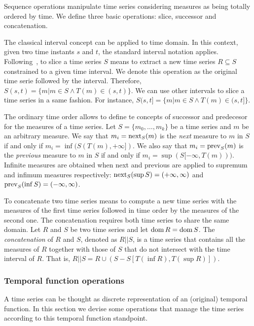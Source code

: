 Sequence operations manipulate time series considering measures as
being totally ordered by time.  We define three basic operations:
slice, successor and concatenation.


The classical interval concept can be applied to time domain. In this
context, given two time instants $s$ and $t$, the standard interval
notation applies.
%
Following~\cite{last:hetland}, to slice a time series $S$ means to
extract a new time series $R\subseteq S$ constrained to a given time
interval. We denote this operation as the original time serie followed
by the interval. Therefore, $S(s,t)=\{m|m\in S \wedge
T(m)\in(s,t)\}$. We can use other intervals to slice a time series in
a same fashion. For instance, $S(s,t]=\{m|m\in S \wedge
T(m)\in(s,t]\}$.

The ordinary time order allows to define te concepts of successor and
predecesor for the measures of a time series.
%
Let $S=\{m_0,\ldots,m_k\}$ be a time series and $m$ be an arbitrary
measure.
%
We say that $m_i=\operatorname*{next}_S(m)$ is the \emph{next} measure to $m$ in $S$ if and
only if $m_i=\inf(S(T(m),+\infty])$.  
%
We also say that $m_i=\operatorname*{prev}_S(m)$ is the \emph{previous} measure to
$m$ in $S$ if and only if $m_i=\sup(S[-\infty,T(m)))$. 
%
Infinite measures are obtained when next and previous are applied to
supremum and infimum measures respectively: $\operatorname*{next}_S(\sup
S)=(+\infty,\infty)$ and $\operatorname*{prev}_S(\inf S)=(-\infty,\infty)$.

To concatenate two time series means to compute a new time series with
the measures of the first time series followed in time order by the
measures of the second one. 
%
The concatenation requires both time series to share the same domain.
Let $R$ and $S$ be two time series and let $\operatorname{dom} R=\operatorname{dom} S$. The
\emph{concatenation} of $R$ and $S$, denoted as $R||S$, is a time
series that contains all the measures of $R$ together with those of
$S$ that do not intersect with the time interval of $R$. That is,
$R||S= R\cup (S - S[T(\inf R),T(\sup R)])$.



\subsubsection{Temporal function operations}
\label{sec:model:tfunc}

A time series can be thought as discrete representation of an
(original) temporal function. In this section we devise some
operations that manage the time series according to this temporal
function standpoint.  
%

